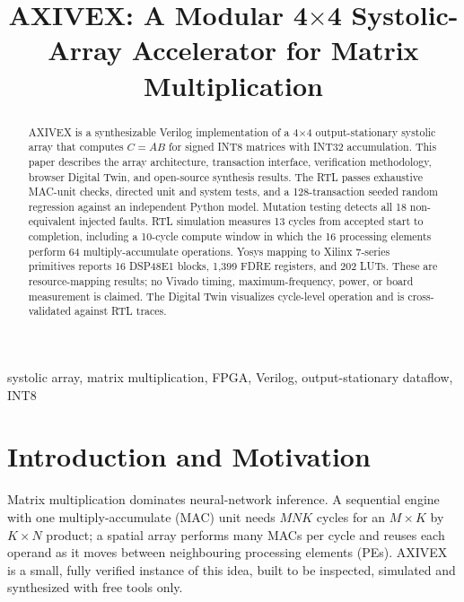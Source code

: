 \documentclass[conference]{IEEEtran}
\begin{document}
\title{AXIVEX: A Modular 4$\times$4 Systolic-Array Accelerator for Matrix Multiplication}

\author{
\and
{}
\and
{}
\and
{}
\and
{}
}

\maketitle

\begin{abstract}
AXIVEX is a synthesizable Verilog implementation of a 4$\times$4 output-stationary systolic array that computes
$C=AB$ for signed INT8 matrices with INT32 accumulation. This paper describes the array architecture, transaction
interface, verification methodology, browser Digital Twin, and open-source synthesis results. The RTL passes exhaustive
MAC-unit checks, directed unit and system tests, and a 128-transaction seeded random regression against an independent
Python model. Mutation testing detects all 18 non-equivalent injected faults. RTL simulation measures 13 cycles from
accepted start to completion, including a 10-cycle compute window in which the 16 processing elements perform 64
multiply-accumulate operations. Yosys mapping to Xilinx 7-series primitives reports 16 DSP48E1 blocks, 1,399 FDRE
registers, and 202 LUTs. These are resource-mapping results; no Vivado timing, maximum-frequency, power, or board
measurement is claimed. The Digital Twin visualizes cycle-level operation and is cross-validated against RTL traces.
\end{abstract}

\begin{IEEEkeywords}
systolic array, matrix multiplication, FPGA, Verilog, output-stationary dataflow, INT8
\end{IEEEkeywords}

\section{Introduction and Motivation}
Matrix multiplication dominates neural-network inference. A sequential engine with one multiply-accumulate (MAC) unit
needs $MNK$ cycles for an $M\times K$ by $K\times N$ product; a spatial array performs many MACs per cycle and reuses each
operand as it moves between neighbouring processing elements (PEs). AXIVEX is a small, fully verified instance of this idea,
built to be inspected, simulated and synthesized with free tools only.
\end{document}
